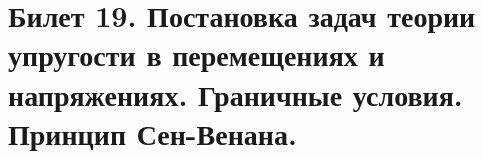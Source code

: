 \newpage
\section{Билет 19. Постановка задач теории упругости в перемещениях и напряжениях. Граничные условия. Принцип Сен-Венана.}